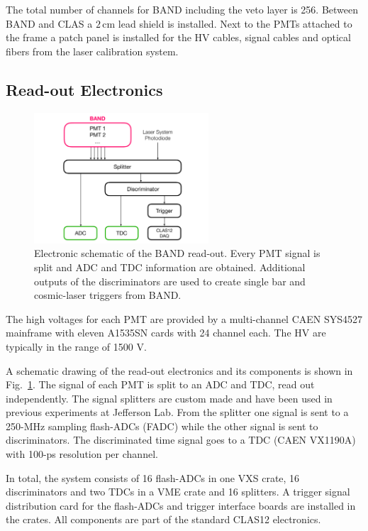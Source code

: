 \documentclass[12pt,letterpaper]{article}
\begin{document}
The total number of channels for BAND including the veto layer is 256. Between BAND and CLAS a $2\,\mathrm{cm}$ lead shield is installed.
Next to the PMTs attached to the frame a patch panel is installed for the HV cables, signal cables and optical fibers from the laser calibration system.

\subsection{Read-out Electronics}

\begin{figure}[tb]
	\centering
	\includegraphics[width=0.58\textwidth]{electronics-diag.pdf}
	\caption{Electronic schematic of the BAND read-out. Every PMT signal is split and ADC and TDC information are obtained. Additional outputs of the discriminators are used to create single bar and cosmic-laser triggers from BAND.}
	\label{fig:electronic-diag}
\end{figure}

The high voltages for each PMT are provided by a multi-channel CAEN SYS4527 mainframe with eleven A1535SN cards with 24 channel each.
The HV are typically in the range of 1500 V.

A schematic drawing of the read-out electronics and its components is
shown in Fig.~\ref{fig:electronic-diag}. The signal of each PMT is
split to an ADC and TDC, read out independently.  The signal splitters
are custom made and have been used in previous experiments at
Jefferson Lab.  From the splitter one signal is sent to a 250-MHz sampling flash-ADCs (FADC) while the
other signal is sent to discriminators.  The discriminated time signal
goes to a TDC (CAEN VX1190A) with 100-ps resolution
per channel.

In total, the system consists of 16 flash-ADCs in one VXS crate, 16
discriminators and two TDCs in a VME crate and 16 splitters.
A trigger signal distribution card for the flash-ADCs and
trigger interface boards are installed in the crates. All components
are part of the standard CLAS12 electronics.
\end{document}
